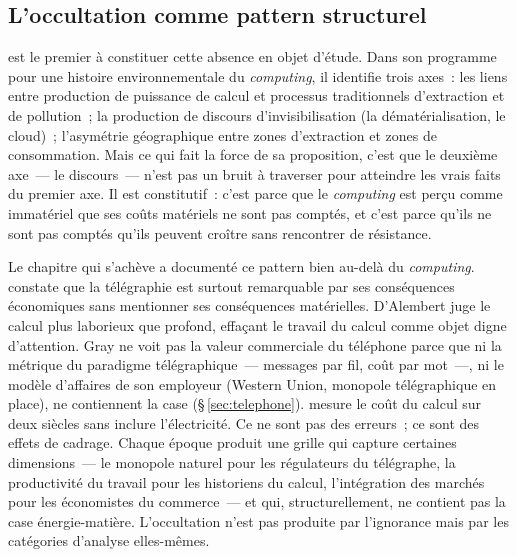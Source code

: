 \subsection{L'occultation comme pattern structurel}\label{subsec:occultation}

\textcite{ensmenger_environmental_2018} est le premier à constituer cette absence en objet d'étude. Dans son programme pour une histoire environnementale du \emph{computing}, il identifie trois axes~: les liens entre production de puissance de calcul et processus traditionnels d'extraction et de pollution~; la production de discours d'invisibilisation (la \og dématérialisation\fg{}, le \og cloud\fg{})~; l'asymétrie géographique entre zones d'extraction et zones de consommation. Mais ce qui fait la force de sa proposition, c'est que le deuxième axe~--- le discours~--- n'est pas un bruit à traverser pour atteindre les \og vrais faits\fg{} du premier axe. Il est constitutif~: c'est parce que le \emph{computing} est perçu comme immatériel que ses coûts matériels ne sont pas comptés, et c'est parce qu'ils ne sont pas comptés qu'ils peuvent croître sans rencontrer de résistance.

Le chapitre qui s'achève a documenté ce pattern bien au-delà du \emph{computing}. \textcite{belloc_telegraphie_1894} constate que la télégraphie est \og surtout remarquable par ses conséquences économiques\fg{} sans mentionner ses conséquences matérielles. D'Alembert juge le calcul \og plus laborieux que profond\fg{}, effaçant le travail du calcul comme objet digne d'attention. Gray ne voit pas la valeur commerciale du téléphone parce que ni la métrique du paradigme télégraphique~--- messages par fil, coût par mot~---, ni le modèle d'affaires de son employeur (Western Union, monopole télégraphique en place), ne contiennent la case (§\,\ref{sec:telephone}). \textcite{nordhaus_two_2007} mesure le coût du calcul sur deux siècles sans inclure l'électricité. Ce ne sont pas des erreurs~; ce sont des effets de cadrage. Chaque époque produit une grille qui capture certaines dimensions~--- le monopole naturel pour les régulateurs du télégraphe, la productivité du travail pour les historiens du calcul, l'intégration des marchés pour les économistes du commerce~--- et qui, structurellement, ne contient pas la case énergie-matière. L'occultation n'est pas produite par l'ignorance mais par les catégories d'analyse elles-mêmes.

